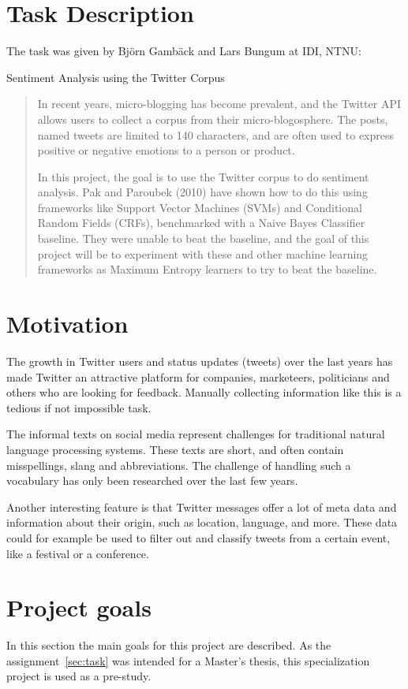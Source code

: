 \section{Task Description}
\label{sec:task}
The task was given by Björn Gambäck and Lars Bungum at IDI, NTNU:
\begin{center} \Large Sentiment Analysis using the Twitter Corpus \end{center}
\begin{quotation}
In recent years, micro-blogging has become prevalent, and the Twitter API allows users to collect a corpus from their micro-blogosphere. The posts, named tweets are limited to 140 characters, and are often used to express positive or negative emotions to a person or product.

In this project, the goal is to use the Twitter corpus to do sentiment analysis. Pak and Paroubek (2010) have shown how to do this using frameworks like Support Vector Machines (SVMs) and Conditional Random Fields (CRFs), benchmarked with a Naive Bayes Classifier baseline. They were unable to beat the baseline, and the goal of this project will be to experiment with these and other machine learning frameworks as Maximum Entropy learners to try to beat the baseline.
\end{quotation}

\section{Motivation}
The growth in Twitter users and status updates (tweets) over the last years has made Twitter an attractive platform for companies, marketeers, politicians and others who are looking for feedback. Manually collecting information like this is a tedious if not impossible task.

The informal texts on social media represent challenges for traditional natural language processing systems. These texts are short, and  often contain misspellings, slang and abbreviations. The challenge of handling such a vocabulary has only been researched over the last few years.

Another interesting feature is that Twitter messages offer a lot of meta data and information about their origin, such as location, language, and more. These data could for example be used to filter out and classify tweets from a certain event, like a festival or a conference.

\section{Project goals}
In this section the main goals for this project are described. As the assignment~\autoref{sec:task} was intended for a Master's thesis, this specialization project is used as a pre-study.

